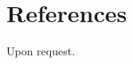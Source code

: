 \documentclass[10pt]{article}
\begin{document}

%



\section*{References}

Upon request.
\end{document}

